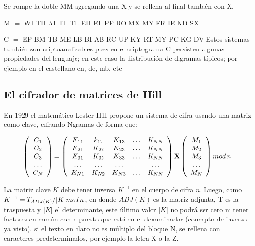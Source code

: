 \documentclass{article}
\begin{document}
Se rompe la doble MM agregando una X y se rellena al final también con X.
 
M $=$ WI TH AL IT TL EH EL PF RO MX MY FR IE ND SX

C $=$ EP BM TB ME LB BI AB RC UP KY RT MY PC KG DV
\justify
Estos sistemas también son criptoanalizables pues en el criptograma C persisten algunas propiedades del lenguaje; en este caso la distribución de digramas típicos; por ejemplo en el castellano en, de, mb, etc


\subsection{El cifrador de matrices de Hill}
\justify
En 1929 el matemático Lester Hill propone un sistema de cifra usando una matriz como clave, cifrando Ngramas de forma que: 

\begin{equation*}
    \left(
    \begin{array}{c}
    C_1  \\
    C_2  \\
    C_3  \\
    \ldots \\
    C_N 
    \end{array} \right) = \left(
    \begin{array}{ccccc}
    K_{11} & k_{12} & K_{13} & \ldots & K_{NN}  \\
    K_{21} & K_{22} & K_{23} & \ldots & K_{NN} \\ 
     K_{31} & K_{32} & K_{33} & \ldots & K_{NN} \\ 
     \ldots & \ldots & \ldots & & \ldots \\
      K_{N1} & K_{N2} & K_{N3} & \ldots & K_{NN} \\ 
    \end{array}\right)
    \mathbf{X} 
    \left( 
    \begin{array}{c}
    M_1\\
    M_2\\
    M_3\\
    \ldots\\
    M_N
    \end{array} \right) mod \thinspace n
\end{equation*}
\justify

La matriz clave $K$ debe tener inversa $K^{-1}$ en el cuerpo de cifra $n$. Luego, como $K^{-1}=T_{ADJ(K)}/\vert K \vert mod \thinspace n$, en donde $ADJ(K)$ es la matriz adjunta, T es la traspuesta y   $\vert K \vert$  el determinante, este último valor $\vert K \vert$  no podrá ser cero ni tener factores en común con n puesto que está en el denominador (concepto de inverso ya visto). si el texto en claro no es múltiplo del bloque N, se rellena con caracteres predeterminados, por ejemplo la letra X o la Z.
\end{document}

